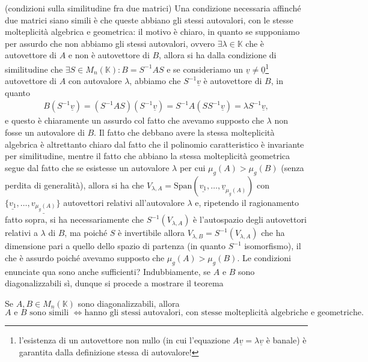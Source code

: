 \begin{remark} (condizioni sulla similitudine fra due matrici)
    Una condizione necessaria affinché due matrici siano simili è che queste abbiano gli stessi autovalori, con le stesse molteplicità algebrica e geometrica: il motivo è chiaro, in quanto se supponiamo per assurdo che non abbiamo gli stessi autovalori, ovvero $\exists \lambda \in \mathbb{K}$ che è autovettore di $A$ e non è autovettore di $B$, allora si ha dalla condizione di 
    similitudine che $\exists S \in M_n(\mathbb{K}) : B = S^{-1} A S$ e se consideriamo un $\underline{v} \neq \underline{0}$\footnote{l'esistenza di un autovettore non nullo (in cui l'equazione $A\underline{v} = \lambda \underline{v}$ è banale) è garantita dalla definizione stessa di autovalore!} autovettore di $A$ con autovalore $\lambda$, abbiamo che $S^{-1} \underline{v}$ è autovettore di $B$, in quanto
    \begin{align}
        B(S^{-1} \underline{v}) = (S^{-1} A S)(S^{-1} \underline{v}) = S^{-1} A (S S^{-1} \underline{v}) = \lambda S^{-1} \underline{v},
    \end{align}
    e questo è chiaramente un assurdo col fatto che avevamo supposto che $\lambda$ non fosse un autovalore di $B$. Il fatto che debbano avere la stessa molteplicità algebrica è altrettanto chiaro dal fatto che il polinomio caratteristico è invariante per similitudine, mentre il fatto che abbiano la stessa molteplicità geometrica segue dal fatto che se esistesse un autovalore $\lambda$ per cui
    $\mu_g(A) > \mu_g(B)$ (senza perdita di generalità), allora si ha che $V_{\lambda, A} = \text{Span}(\underline{v_1}, \ldots, \underline{v}_{\mu_g(A)})$ con $\{ \underline{v_1}, \ldots, \underline{v_{\mu_g(A)}} \}$ autovettori relativi all'autovalore $\lambda$ e, ripetendo il ragionamento fatto sopra, si ha necessariamente che $S^{-1}(V_{\lambda, A})$ è l'autospazio degli autovettori relativi a $\lambda$ di $B$, ma poiché
    $S$ è invertibile allora $V_{\lambda, B} = S^{-1}(V_{\lambda, A})$ che ha dimensione pari a quello dello spazio di partenza (in quanto $S^{-1}$ isomorfismo), il che è assurdo poiché avevamo supposto che $\mu_g(A) > \mu_g(B)$.
    Le condizioni enunciate qua sono anche sufficienti? Indubbiamente, se $A$ e $B$ sono diagonalizzabili sì, dunque si procede a mostrare il teorema
    \begin{theorem}
        Se $A, B \in M_n(\mathbb{K})$ sono diagonalizzabili, allora
        $$
            A \text{ e } B \text{ sono simili } \iff \text{hanno gli stessi autovalori, con stesse molteplicità algebriche e geometriche}. 
$$
\end{theorem}
\end{remark}
